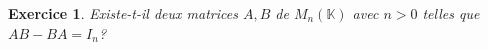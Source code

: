 \documentclass[12pt,a4paper]{article}
\newcommand{\R}{\mathbb{R}}
\newcommand{\K}{\mathbb{K} }
\DeclareMathOperator{\vect}{Vect}
\theoremstyle{break}
\theoremstyle{break}
\newtheorem{Exo}{Exercice}
\begin{document}
%

\begin{Exo}
	Existe-t-il deux matrices $A,B$ de $M_n(\K)$ avec $n>0$ telles que $AB-BA=I_n$?
\end{Exo}
\end{document}
